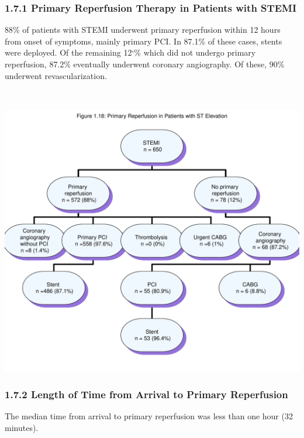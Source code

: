 \documentclass[
]{article}
\begin{document}
\subsubsection{1.7.1 Primary Reperfusion Therapy in Patients with
STEMI}\label{primary-reperfusion-therapy-in-patients-with-stemi}

88\% of patients with STEMI underwent primary reperfusion within 12
hours from onset of symptoms, mainly primary PCI. In 87.1\% of these
cases, stents were deployed. Of the remaining 12`\% which did not
undergo primary reperfusion, 87.2\% eventually underwent coronary
angiography. Of these, 90\% underwent revascularization.

~

\includegraphics{‏‏ACSIS_2024_v1_pdf_without_files/figure-latex/unnamed-chunk-59-1.pdf}

\pagebreak

\subsubsection{1.7.2 Length of Time from Arrival to Primary
Reperfusion}\label{length-of-time-from-arrival-to-primary-reperfusion}

The median time from arrival to primary reperfusion was less than one
hour (32 minutes).

~
\end{document}
